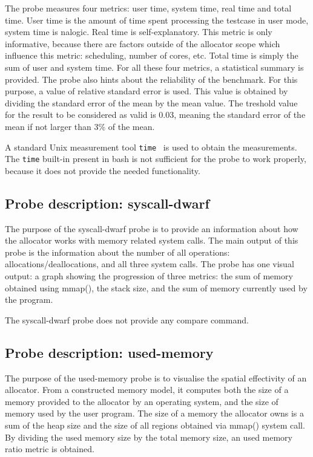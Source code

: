 The probe measures four metrics: user time, system time, real time and total time. User time is the amount of time spent processing the testcase in user mode, system time is nalogic. Real time is self-explanatory. This metric is only informative, because there are factors outside of the allocator scope which influence this metric: scheduling, number of cores, etc. Total time is simply the sum of user and system time. For all these four metrics, a statistical summary is provided. The probe also hints about the reliability of the benchmark. For this purpose, a value of relative standard error is used. This value is obtained by dividing the standard error of the mean by the mean value. The treshold value for the result to be considered as valid is 0.03, meaning the standard error of the mean if not larger than 3\% of the mean.

A standard Unix measurement tool {\tt time}~\cite{man-time} is used to obtain the measurements. The {\tt time} built-in present in bash is not sufficient for the probe to work properly, because it does not provide the needed functionality.

\subsection{Probe description: syscall-dwarf}

The purpose of the syscall-dwarf probe is to provide an information about how the allocator works with memory related system calls. The main output of this probe is the information about the number of all operations: allocations/deallocations, and all three system calls. The probe has one visual output: a graph showing the progression of three metrics: the sum of memory obtained using mmap(), the stack size, and the sum of memory currently used by the program.

The syscall-dwarf probe does not provide any compare command.

\subsection{Probe description: used-memory}

The purpose of the used-memory probe is to visualise the spatial effectivity of an allocator. From a constructed memory model, it computes both the size of a memory provided to the allocator by an operating system, and the size of memory used by the user program. The size of a memory the allocator owns is a sum of the heap size and the size of all regions obtained via mmap() system call. By dividing the used memory size by the total memory size, an used memory ratio metric is obtained.

